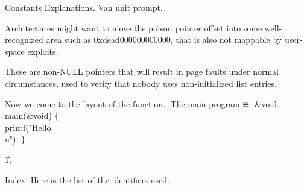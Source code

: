 Constants Explanations.
\vskip 8pt
 \hfil\break\indent
Van unit prompt. \hfil\break

 \hfil\break\indent
Architectures might want to move the poison pointer offset
into some well-recognized area such as \hfil\break\indent
0xdead000000000000, that is also not mappable by user-space exploits. \hfil%
\break

 \hfil\break
{} \hfil\break\indent
These are non-NULL pointers that will result in page faults
under normal circumstances, used to verify \hfil\break\indent
that nobody uses non-initialized list entries. \hfil\break

\fi

Now we come to the layout of the  function.
\Y\B\4:The main program\X${}\equiv{}$\6
\1\1\&{void} \\{main}(\&{void})\2\2\6
${}\{{}$\1\6
\\{printf}(\.{"Hello.\\n"});\6
\4${}\}{}$\2\par
\U1.\fi

Index.
Here is the list of the identifiers used.
\fi

\inx
\fin
\con
